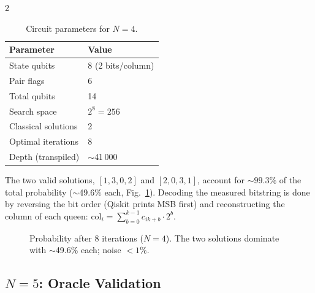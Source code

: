 \documentclass[9pt, a4paper]{extarticle}
\begin{document}
\begin{multicols}{2}
\begin{table}[H]
    \centering
    \caption{Circuit parameters for $N = 4$.}
    \label{tab:params}
    \scriptsize
    \begin{tabular}{@{}ll@{}}
        \toprule
        Parameter & Value \\
        \midrule
        State qubits & 8 (2 bits/column) \\
        Pair flags & 6 \\
        Total qubits & 14 \\
        Search space & $2^8 = 256$ \\
        Classical solutions & 2 \\
        Optimal iterations & 8 \\
        Depth (transpiled) & $\sim$41\,000 \\
        \bottomrule
    \end{tabular}
\end{table}

The two valid solutions, $[1,3,0,2]$ and $[2,0,3,1]$, account for $\sim\!99.3\%$ of the total probability ($\sim$49.6\% each, Fig.~\ref{fig:results}). Decoding the measured bitstring is done by reversing the bit order (Qiskit prints MSB first) and reconstructing the column of each queen: $\text{col}_i = \sum_{b=0}^{k-1} c_{ik+b} \cdot 2^b$.

\begin{figure}[H]
    \centering
    \caption{Probability after 8 iterations ($N\!=\!4$). The two solutions dominate with $\sim$49.6\% each; noise $<1\%$.}
    \label{fig:results}
\end{figure}

\subsection{\texorpdfstring{$N=5$}{N=5}: Oracle Validation}


\end{multicols}
\end{document}
